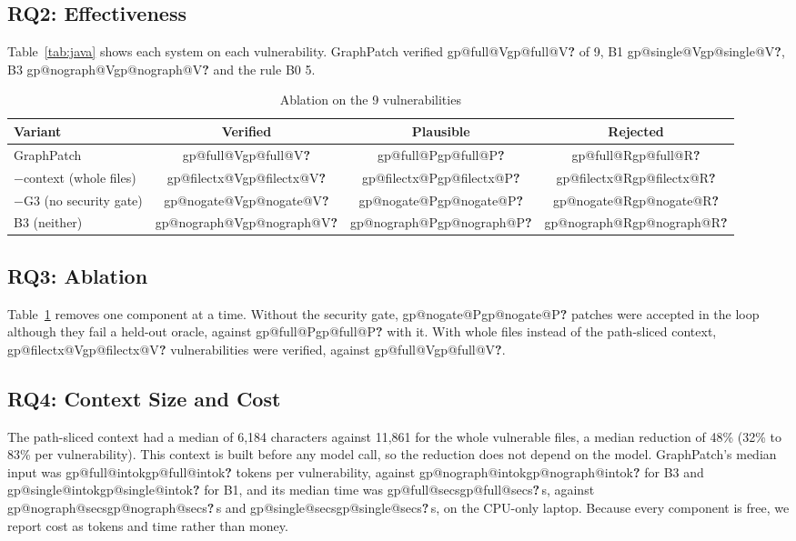 \documentclass[conference]{IEEEtran}
\makeatletter
\newcommand{\res}[1]{\ifcsname gp@#1\endcsname\csname gp@#1\endcsname\else\textbf{?}\fi}
\makeatother
\begin{document}
\subsection{RQ2: Effectiveness}
Table~\ref{tab:java} shows each system on each vulnerability. GraphPatch verified
\res{full@V} of 9, B1 \res{single@V}, B3 \res{nograph@V} and the rule B0 5.

\begin{table}[t]
\centering
\caption{Ablation on the 9 vulnerabilities}
\label{tab:ablation}
\begin{tabular}{lccc}
\toprule
Variant & Verified & Plausible & Rejected \\
\midrule
GraphPatch & \res{full@V} & \res{full@P} & \res{full@R} \\
$-$context (whole files) & \res{filectx@V} & \res{filectx@P} & \res{filectx@R} \\
$-$G3 (no security gate) & \res{nogate@V} & \res{nogate@P} & \res{nogate@R} \\
B3 (neither) & \res{nograph@V} & \res{nograph@P} & \res{nograph@R} \\
\bottomrule
\end{tabular}
\end{table}

\subsection{RQ3: Ablation}
Table~\ref{tab:ablation} removes one component at a time. Without the security gate,
\res{nogate@P} patches were accepted in the loop although they fail a held-out oracle,
against \res{full@P} with it. With whole files instead of the path-sliced context,
\res{filectx@V} vulnerabilities were verified, against \res{full@V}.

\subsection{RQ4: Context Size and Cost}
The path-sliced context had a median of 6,184 characters against 11,861 for the whole
vulnerable files, a median reduction of 48\% (32\% to 83\% per vulnerability). This
context is built before any model call, so the reduction does not depend on the model.
GraphPatch's median input was \res{full@intok} tokens per vulnerability, against
\res{nograph@intok} for B3 and \res{single@intok} for B1, and its median time was
\res{full@secs}\,s, against \res{nograph@secs}\,s and \res{single@secs}\,s, on the
CPU-only laptop. Because every component is free, we report cost as tokens and time
rather than money.
\end{document}
